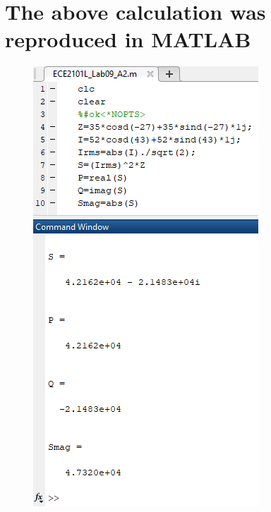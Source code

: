 \documentclass{article}
\begin{document}
\section{The above calculation was reproduced in MATLAB}
\begin{figure}[H]
    \centering
        \includegraphics[scale=0.8]{ECE2101L_Lab09_A2.png}
\end{figure}
\end{document}
